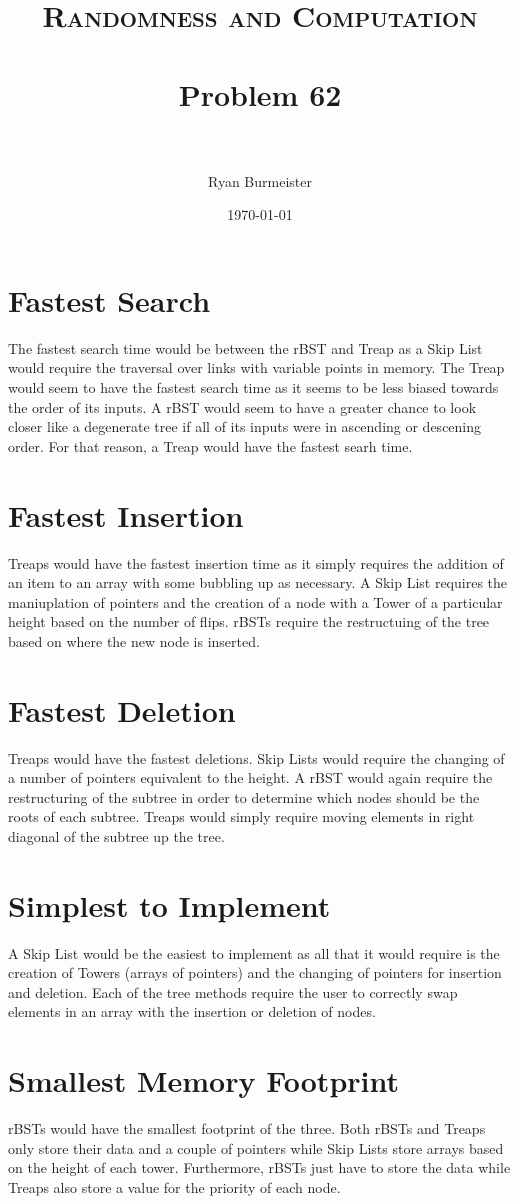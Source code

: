 \documentclass[fontsize=12pt]{article}
\title{ 
  \normalfont \normalsize 
  \textsc{Randomness and Computation} \\ [25pt] %
  \horrule{0.5pt} \\[0.4cm] %
  \huge Problem 62 \\ %
  \horrule{2pt} \\[0.5cm] %
}
\author{Ryan Burmeister} %
\date{\normalsize\today} %
\numberwithin{equation}{section} %
\numberwithin{figure}{section} %
\numberwithin{table}{section} %
\begin{document}
\maketitle %
\section{Fastest Search}
The fastest search time would be between the rBST and Treap as a Skip List
would require the traversal over links with variable points in memory.  The
Treap would seem to have the fastest search time as it seems to be less biased
towards the order of its inputs.  A rBST would seem to have a greater chance to
look closer like a degenerate tree if all of its inputs were in ascending or
descening order.  For that reason, a Treap would have the fastest searh time.

\section{Fastest Insertion}
Treaps would have the fastest insertion time as it simply requires the addition
of an item to an array with some bubbling up as necessary.  A Skip List
requires the maniuplation of pointers and the creation of a node with a Tower
of a particular height based on the number of flips.  rBSTs require the
restructuing of the tree based on where the new node is inserted.

\section{Fastest Deletion}
Treaps would have the fastest deletions.  Skip Lists would require the changing
of a number of pointers equivalent to the height.  A rBST would again require the
restructuring of the subtree in order to determine which nodes should be the roots
of each subtree.  Treaps would simply require moving elements in right diagonal of
the subtree up the tree.

\section{Simplest to Implement}
A Skip List would be the easiest to implement as all that it would require is
the creation of Towers (arrays of pointers) and the changing of pointers for
insertion and deletion.  Each of the tree methods require the user to correctly
swap elements in an array with the insertion or deletion of nodes.

\section{Smallest Memory Footprint}
rBSTs would have the smallest footprint of the three.  Both rBSTs and Treaps
only store their data and a couple of pointers while Skip Lists store arrays
based on the height of each tower.  Furthermore, rBSTs just have to store the
data while Treaps also store a value for the priority of each node.
\end{document}
